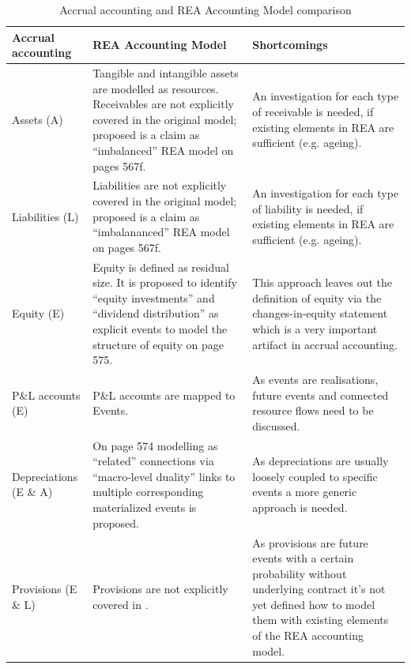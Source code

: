 \begin{table}
	\caption{Accrual accounting and REA Accounting Model comparison}\label{tab:accrualaccounting}
\begin{center}
\begin{tabular}{|p{}|p{}|p{}|}
	\hline 
	Accrual accounting & REA Accounting Model \cite{mccarthy1982rea} & Shortcomings \\ 
	\hline 
	Assets (A) & Tangible and intangible assets are modelled as resources. Receivables are not explicitly covered in the original model; proposed is a claim as “imbalanced” REA model on pages 567f. %
	& An investigation for each type of receivable is needed, if existing elements in REA are sufficient (e.g. ageing). \\ 
	\hline 
	Liabilities (L) & Liabilities are not explicitly covered in the original model; proposed is a claim as “imbalananced” REA model on pages 567f. %
	& An investigation for each type of liability is needed, if existing elements in REA are sufficient (e.g. ageing). \\ 
	\hline 
	Equity (E) & %
	Equity is defined as residual size. It is proposed to identify “equity investments” and “dividend distribution” as explicit events to model the structure of equity on page 575. & This approach leaves out the definition of equity via the changes-in-equity statement which is a very important artifact in accrual accounting. \\
	\hline
	P\&L accounts (E) & %
	 P\&L accounts are mapped to Events. & As events are realisations, future events and connected resource flows need to be discussed. \\ 
	\hline 
	Depreciations (E \& A) & On page 574 modelling as “related” connections via “macro-level duality” links to multiple corresponding materialized events is proposed. & As depreciations are usually loosely coupled to specific events a more generic approach is needed. \\ 
	\hline
	Provisions (E \& L)  & Provisions are not explicitly covered in \cite{mccarthy1982rea}. & As provisions are future events with a certain probability without underlying contract it's not yet defined how to model them with existing elements of the REA accounting model. \\

\end{tabular}
\end{center}
\end{table}
